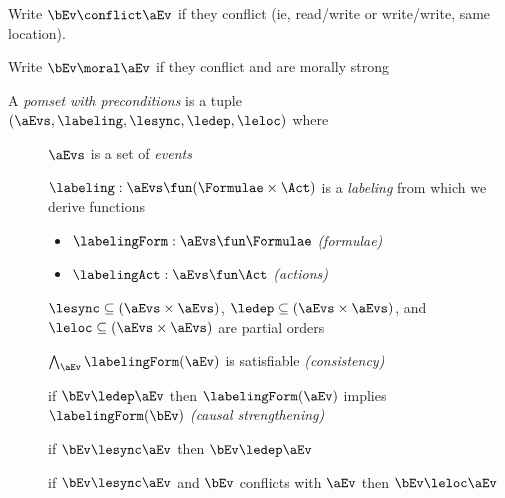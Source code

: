Write $\bEv\conflict\aEv$ if they conflict (ie, read/write or write/write, same location).

Write $\bEv\moral\aEv$ if they conflict and are morally strong

\begin{definition}
  A \emph{pomset with preconditions} is a tuple
  $(\aEvs, \labeling, {\lesync}, {\ledep}, {\leloc})$ where
  \begin{description}
  \item[{}] $\aEvs$ is a set of \emph{events}
  \item[{}]
    $\labeling: \aEvs \fun (\Formulae\times\Act)$ is a \emph{labeling} from
    which we derive functions
    \begin{itemize}
    \item $\labelingForm:\aEvs\fun\Formulae$
      \emph{(formulae)} %
    \item $\labelingAct:\aEvs\fun\Act$
      \emph{(actions)} %
    \end{itemize}
  \item[{}]
    ${\lesync} \subseteq (\aEvs\times\aEvs)$,
    ${\ledep} \subseteq (\aEvs\times\aEvs)$, and
    ${\leloc} \subseteq (\aEvs\times\aEvs)$ are partial orders
  \item[{}] $\bigwedge_{\aEv}\labelingForm(\aEv)$ is satisfiable \emph{(consistency)}
  \item[{}] if $\bEv\ledep\aEv$ then $\labelingForm(\aEv)$ implies $\labelingForm(\bEv)$ \emph{(causal strengthening)} 
  \item[{}] if $\bEv\lesync\aEv$ then $\bEv\ledep\aEv$
  \item[{}] if $\bEv\lesync\aEv$ and $\bEv$ conflicts with $\aEv$ then $\bEv\leloc\aEv$
  \end{description}
\end{definition}





